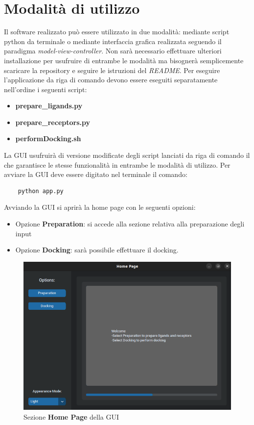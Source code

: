 \section{Modalità di utilizzo}
Il software realizzato può essere utilizzato in due modalità: mediante script python da terminale o mediante interfaccia grafica realizzata seguendo il paradigma \textit{model-view-controller}.\newline
Non sarà necessario effettuare ulteriori installazione per usufruire di entrambe le modalità ma bisognerà semplicemente scaricare la repository e seguire le istruzioni del \textit{README}.\newline
Per eseguire l'applicazione da riga di comando devono essere eseguiti separatamente nell'ordine i seguenti script:
\begin{itemize}
    \item \textbf{prepare\_ligands.py}
    \item \textbf{prepare\_receptors.py}
    \item \textbf{performDocking.sh}
\end{itemize}

La GUI usufruirà di versione modificate degli script lanciati da riga di comando il che garantisce le stesse funzionalità in entrambe le modalità di utilizzo.\newline
Per avviare la GUI deve essere digitato nel terminale il comando:

\begin{verbatim}
    python app.py    
\end{verbatim}

Avviando la GUI si aprirà la home page con le seguenti opzioni:

\begin{itemize}
    \item Opzione \textbf{Preparation}: si accede alla sezione relativa alla preparazione degli input
    \item Opzione \textbf{Docking}: sarà possibile effettuare il docking.
\end{itemize}

\begin{figure}[H]
    \centering
    \includegraphics[scale=0.6]{immagini/homePage.png}
    \caption{Sezione \textbf{Home Page} della GUI}
    \label{fig:Home Page}
\end{figure}


